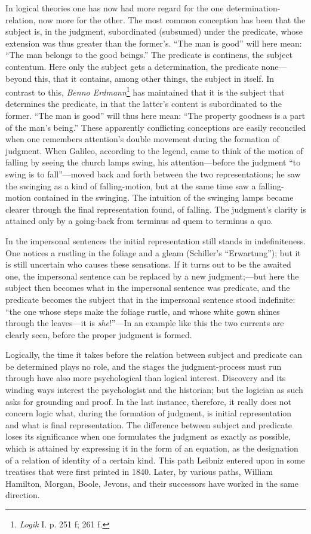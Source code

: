 \documentclass[12pt,a4paper]{book}
\newcommand{\opage}[1]{\marginnote{\footnotesize\textit{[#1]}}}
\begin{document}
In logical theories one has now had more regard for the one
determination-relation, now more for the other. The most common conception
has been that the subject is, in the judgment, subordinated (subsumed)
under the predicate, whose extension was thus greater than the former's.
``The man is good'' will here mean: ``The man belongs to the good
beings.'' The predicate is continens, the subject contentum. Here only the
subject gets a determination, the predicate none---beyond this, that it
contains, among other things, the subject in itself. In contrast to this,
\emph{Benno Erdmann}\footnote{\emph{Logik} I. p. 251 f; 261 f.} has
maintained that it is the subject \opage{93}that determines the predicate, in that
the latter's content is subordinated to the former. ``The man is good''
will thus here mean: ``The property goodness is a part of the man's
being.'' These apparently conflicting conceptions are easily reconciled
when one remembers attention's double movement during the formation of
judgment. When Galileo, according to the legend, came to think of the
motion of falling by seeing the church lamps swing, his attention---before
the judgment ``to swing is to fall''---moved back and forth between the two
representations; he saw the swinging as a kind of falling-motion, but at
the same time saw a falling-motion contained in the swinging. The intuition
of the swinging lamps became clearer through the final representation
found, of falling. The judgment's clarity is attained only by a
going-back from terminus ad quem to terminus a quo.

In the impersonal sentences the initial representation still stands in
indefiniteness. One notices a rustling in the foliage and a gleam
(Schiller's ``Erwartung''); but it is still uncertain who causes these
sensations. If it turns out to be the awaited one, the impersonal sentence
can be replaced by a new judgment;---but here the subject then becomes what
in the impersonal sentence was predicate, and the predicate becomes the
subject that in the impersonal sentence stood indefinite: ``the one whose
steps make the foliage rustle, and whose white gown shines through the
leaves---it is \emph{she}!''---In an example like this the two currents are
clearly seen, before the proper judgment is formed.

Logically, the time it takes before the relation between subject and
predicate can be determined plays no role, and the stages the
judgment-process must run through have also more psychological than logical
interest. Discovery and its winding ways interest the psychologist and the
historian; but the logician as such asks for grounding and proof. In the
last instance, therefore, it really does not concern logic what, during
the formation of judgment, is initial representation and what is final
representation. The difference between subject and \opage{94}predicate loses its
significance when one formulates the judgment as exactly as possible,
which is attained by expressing it in the form of an equation, as the
designation of a relation of identity of a certain kind. This path Leibniz
entered upon in some treatises that were first printed in 1840. Later, by
various paths, William Hamilton, Morgan, Boole, Jevons, and their
successors have worked in the same direction.
\end{document}
